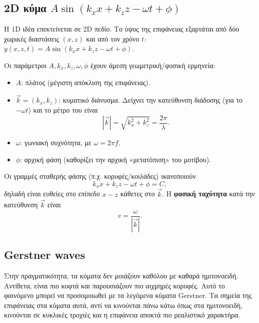 \documentclass[a4paper, 11pt]{article}
\providecommand{\tightlist}{\setlength{\itemsep}{0pt}\setlength{\parskip}{0pt}}
\begin{document}
\subsection{\texorpdfstring{2D κύμα
\(A\sin(k_x x + k_z z - \omega t + \phi)\)}{2D κύμα A\textbackslash sin(k\_x x + k\_z z - \textbackslash omega t + \textbackslash phi)}}\label{d-ux3baux3cdux3bcux3b1-asink_x-x-k_z-z---omega-t-phi}

Η 1D ιδέα επεκτείνεται σε 2D πεδίο. Το ύψος της επιφάνειας εξαρτάται από
δύο χωρικές διαστάσεις \((x,z)\) και από τον χρόνο \(t\):
\(y(x,z,t)=A\sin(k_x x + k_z z - \omega t + \phi)\).

Οι παράμετροι \(A, k_x, k_z, \omega, \phi\) έχουν άμεση
γεωμετρική/φυσική ερμηνεία:

\begin{itemize}
\tightlist
\item
  \(A\): πλάτος (μέγιστη απόκλιση της επιφάνειας).
\item
  \(\vec{k}=(k_x,k_z)\): κυματικό διάνυσμα. Δείχνει την κατεύθυνση
  διάδοσης (για το \(-\omega t\)) και το μέτρο του είναι \[
  |\vec{k}|=\sqrt{k_x^2+k_z^2}=\frac{2\pi}{\lambda}.
  \]
\item
  \(\omega\): γωνιακή συχνότητα, με \(\omega=2\pi f\).
\item
  \(\phi\): αρχική φάση (καθορίζει την αρχική «μετατόπιση» του μοτίβου).
\end{itemize}

Οι γραμμές σταθερής φάσης (π.χ. κορυφές/κοιλάδες) ικανοποιούν \[
k_x x + k_z z - \omega t + \phi = C,
\] δηλαδή είναι ευθείες στο επίπεδο \(x\!-\!z\) κάθετες στο \(\vec{k}\).
Η \textbf{φασική ταχύτητα} κατά την κατεύθυνση \(\vec{k}\) είναι \[
v=\frac{\omega}{|\vec{k}|}.
\]

\subsection{Gerstner waves}\label{gerstner-waves}

Στην πραγματικότητα, τα κύματα δεν μοιάζουν καθόλου με καθαρά
ημιτονοειδή. Αντίθετα, είναι πιο κοφτά και παρουσιάζουν πιο αιχμηρές
κορυφές. Αυτό το φαινόμενο μπορεί να προσομοιωθεί με τα λεγόμενα κύματα
Gerstner. Τα σημεία της επιφάνειας στα κύματα αυτά, αντί να κινούνται
πάνω κάτω όπως στα ημιτονοειδή, κινούνται σε κυκλικές τροχιές και η
επιφάνεια αποκτά πιο ρεαλιστικό χαρακτήρα.
\end{document}
